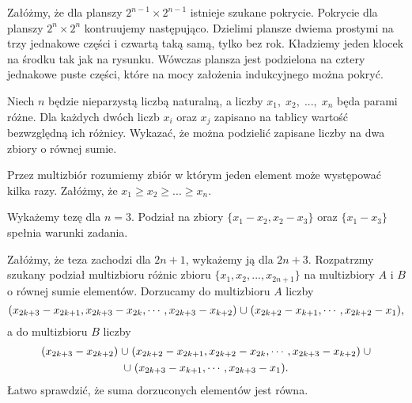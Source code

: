 \noindent
Załóżmy, że dla planszy $2^{n - 1} \times 2^{n - 1}$ istnieje szukane pokrycie. Pokrycie dla planszy $2^{n} \times 2^{n}$ kontruujemy następująco. Dzielimi plansze dwiema prostymi na trzy jednakowe części i czwartą taką samą, tylko bez rok. Kładziemy jeden klocek na środku tak jak na rysunku. Wówczas plansza jest podzielona na cztery jednakowe puste części, które na mocy założenia indukcyjnego można pokryć.

\begin{problem}{7}
Niech $n$ będzie nieparzystą liczbą naturalną, a liczby $x_1,\; x_2,\; ...,\; x_n$ będa parami różne. Dla każdych dwóch liczb $x_i$ oraz $x_j$ zapisano na tablicy wartość bezwzględną ich różnicy. Wykazać, że można podzielić zapisane liczby na dwa zbiory o równej sumie.
\end{problem}
\noindent
Przez multizbiór rozumiemy zbiór w którym jeden element może występować kilka razy.
Załóżmy, że $x_1 \geqslant x_2 \geqslant ... \geqslant x_n$. 
\vspace{10px}

\noindent
Wykażemy tezę dla $n = 3$. Podział na zbiory $\{x_1 - x_2, x_2 - x_3\}$ oraz $\{x_1 - x_3\}$ spełnia warunki zadania.
\vspace{10px}

\noindent
Załóżmy, że teza zachodzi dla $2n + 1$, wykażemy ją dla $2n + 3$.
Rozpatrzmy szukany podział multizbioru różnic zbioru $\{x_1, x_2, ..., x_{2n + 1}\}$ na multizbiory $A$ i $B$ o równej sumie elementów.
Dorzucamy do multizbioru $A$ liczby
\[
	({x_{2k+3}-x_{2k+1},x_{2k+3}-x_{2k},\cdots,x_{2k+3}-x_{k+2}}) \thickspace {\cup}\thickspace ({x_{2k+2}-x_{k+1},\cdots,x_{2k+2}-x_1}),
\]
a do multizbioru $B$ liczby
\begin{gather*}
	(x_{2k+3} - x_{2k+2}) \thickspace {\cup}\thickspace ({x_{2k+2} - x_{2k+1}, x_{2k+2} - x_{2k}, \cdots, x_{2k+3} - x_{k+2}}) \thickspace {\cup} \\ {\cup} \thickspace({x_{2k+3}-x_{k+1},\cdots,x_{2k+3}-x_1}).
\end{gather*}
Łatwo sprawdzić, że suma dorzuconych elementów jest równa.